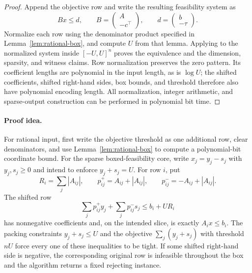 \documentclass[11pt]{article}
\theoremstyle{remark}
\begin{document}
\begin{proof}
Append the objective row and write the resulting feasibility system as
\[
  Bx\leq d,
  \qquad
  B=
  \begin{pmatrix}
    A\\ -c^\top
  \end{pmatrix},
  \qquad
  d=
  \begin{pmatrix}
    b\\ -\tau
  \end{pmatrix}.
\]
Normalize each row using the denominator product specified in
Lemma~\ref{lem:rational-box}, and compute $U$ from
that lemma.  Applying  to the normalized
system inside $[-U,U]^n$ proves the equivalence and the dimension,
sparsity, and witness claims.  Row normalization preserves the zero
pattern.  Its coefficient lengths are polynomial in the input length,
as is $\log U$; the shifted coefficients, shifted right-hand sides, box
bounds, and threshold therefore also have polynomial encoding length.
All normalization, integer arithmetic, and sparse-output construction
can be performed in polynomial bit time.
\end{proof}

\paragraph{Proof idea.}
For rational input, first write the objective threshold as one
additional row, clear denominators, and use
Lemma~\ref{lem:rational-box} to compute a polynomial-bit coordinate bound.
For the sparse boxed-feasibility core, write $x_j=y_j-s_j$ with
$y_j,s_j\geq0$ and intend to enforce
$y_j+s_j=U$.  For row $i$, put
\[
  R_i=\sum_j|A_{ij}|,
  \qquad p^+_{ij}=A_{ij}+|A_{ij}|,
  \qquad p^-_{ij}=-A_{ij}+|A_{ij}|.
\]
The shifted row
\[
  \sum_jp^+_{ij}y_j+\sum_jp^-_{ij}s_j
  \leq b_i+UR_i
\]
has nonnegative coefficients and, on the intended slice, is exactly
$A_i x\leq b_i$.  The packing constraints $y_j+s_j\leq U$ and the
objective $\sum_j(y_j+s_j)$ with threshold $nU$ force every one of
these inequalities to be tight.  If some shifted right-hand side is
negative, the corresponding original row is infeasible throughout the
box and the algorithm returns a fixed rejecting instance.
\end{document}
